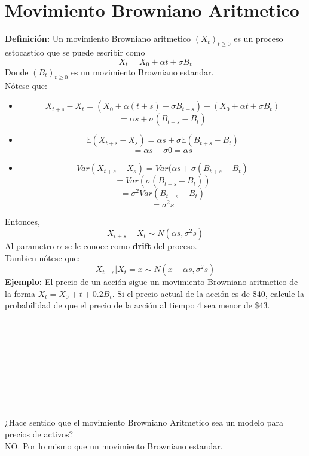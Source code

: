 \documentclass[12pts]{extarticle}
\begin{document}
\section{Movimiento Browniano Aritmetico} 
\textbf{Definición:} Un movimiento Browniano aritmetico $(X_t)_{t \geq 0}$ es un proceso estocastico que se puede escribir como $$ X_t =X_0+\alpha t +\sigma B_t$$ Donde $(B_t)_{t\geq 0}$ es un movimiento Browniano estandar. 
\\ Nótese que:
\begin{itemize}
\item $$X_{t+s}-X_t = (X_0 +\alpha (t+s)+\sigma B_{t+s})+(X_0+\alpha t +\sigma B_t)$$
$$=\alpha s +\sigma (B_{t+s} - B_t)$$  
\item $$\mathbb{E}(X_{t+s}-X_s)=\alpha s+\sigma \mathbb{E}(B_{t+s} - B_t)$$
         $$ =\alpha s +\sigma 0 =  \alpha s$$
\item $$ Var(X_{t+s}-X_s)=Var( \alpha s + \sigma (B_{t+s} - B_t)$$
         $$ =Var(\sigma(B_{t+s} - B_t))$$
         $$ = \sigma^2 Var(B_{t+s} - B_t)$$
         $$ =\sigma^2 s$$
\end{itemize}
Entonces, $$ X_{t+s}-X_t \sim N(\alpha s, \sigma^2 s)$$
Al parametro $\alpha$ se le conoce como \textbf{drift} del proceso. \\
Tambien nótese que: $$ X_{t+s}|X_t = x \sim N(x+\alpha s, \sigma^2 s)$$
\textbf{Ejemplo:} El precio de un acción sigue un movimiento Browniano aritmetico de la forma $X_t = X_0 +t+0.2B_t$. Si el precio actual de la acción es de \$40, calcule la probabilidad de que el precio de la acción al tiempo 4 sea menor de \$43. 
\\ \\ \\ \\ \\ \\ \\ \\ \\ \\ 
¿Hace sentido que el movimiento Browniano Aritmetico sea un modelo para precios de activos? \\
NO. Por lo mismo que un movimiento Browniano estandar. 
\\ 
\end{document}
